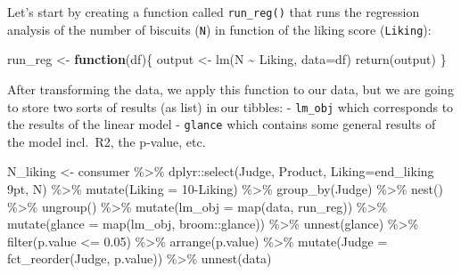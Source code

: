 \documentclass[
]{book}
\newenvironment{Shaded}{\begin{snugshade}}{\end{snugshade}}
\newcommand{\AttributeTok}[1]{\textcolor[rgb]{0.77,0.63,0.00}{#1}}
\newcommand{\ControlFlowTok}[1]{\textcolor[rgb]{0.13,0.29,0.53}{\textbf{#1}}}
\newcommand{\DecValTok}[1]{\textcolor[rgb]{0.00,0.00,0.81}{#1}}
\newcommand{\FloatTok}[1]{\textcolor[rgb]{0.00,0.00,0.81}{#1}}
\newcommand{\FunctionTok}[1]{\textcolor[rgb]{0.00,0.00,0.00}{#1}}
\newcommand{\NormalTok}[1]{#1}
\newcommand{\OtherTok}[1]{\textcolor[rgb]{0.56,0.35,0.01}{#1}}
\newcommand{\SpecialCharTok}[1]{\textcolor[rgb]{0.00,0.00,0.00}{#1}}
\newcommand{\StringTok}[1]{\textcolor[rgb]{0.31,0.60,0.02}{#1}}
\begin{document}
Let's start by creating a function called \texttt{run\_reg()} that runs the regression analysis of the number of biscuits (\texttt{N}) in function of the liking score (\texttt{Liking}):

\begin{Shaded}
\begin{Highlighting}[]
\NormalTok{run\_reg }\OtherTok{\textless{}{-}} \ControlFlowTok{function}\NormalTok{(df)\{}
\NormalTok{  output }\OtherTok{\textless{}{-}} \FunctionTok{lm}\NormalTok{(N }\SpecialCharTok{\textasciitilde{}}\NormalTok{ Liking, }\AttributeTok{data=}\NormalTok{df)}
  \FunctionTok{return}\NormalTok{(output)}
\NormalTok{\}}
\end{Highlighting}
\end{Shaded}

After transforming the data, we apply this function to our data, but we are going to store two sorts of results (as list) in our tibbles:
- \texttt{lm\_obj} which corresponds to the results of the linear model
- \texttt{glance} which contains some general results of the model incl.~R2, the p-value, etc.

\begin{Shaded}
\begin{Highlighting}[]
\NormalTok{N\_liking }\OtherTok{\textless{}{-}}\NormalTok{ consumer }\SpecialCharTok{\%\textgreater{}\%} 
\NormalTok{  dplyr}\SpecialCharTok{::}\FunctionTok{select}\NormalTok{(Judge, Product, }\AttributeTok{Liking=}\StringTok{\textasciigrave{}}\AttributeTok{end\_liking 9pt}\StringTok{\textasciigrave{}}\NormalTok{, N) }\SpecialCharTok{\%\textgreater{}\%} 
  \FunctionTok{mutate}\NormalTok{(}\AttributeTok{Liking =} \DecValTok{10}\SpecialCharTok{{-}}\NormalTok{Liking) }\SpecialCharTok{\%\textgreater{}\%} 
  \FunctionTok{group\_by}\NormalTok{(Judge) }\SpecialCharTok{\%\textgreater{}\%}
  \FunctionTok{nest}\NormalTok{() }\SpecialCharTok{\%\textgreater{}\%}
  \FunctionTok{ungroup}\NormalTok{() }\SpecialCharTok{\%\textgreater{}\%}
  \FunctionTok{mutate}\NormalTok{(}\AttributeTok{lm\_obj =} \FunctionTok{map}\NormalTok{(data, run\_reg)) }\SpecialCharTok{\%\textgreater{}\%} 
  \FunctionTok{mutate}\NormalTok{(}\AttributeTok{glance =} \FunctionTok{map}\NormalTok{(lm\_obj, broom}\SpecialCharTok{::}\NormalTok{glance)) }\SpecialCharTok{\%\textgreater{}\%} 
  \FunctionTok{unnest}\NormalTok{(glance) }\SpecialCharTok{\%\textgreater{}\%} 
  \FunctionTok{filter}\NormalTok{(p.value }\SpecialCharTok{\textless{}=} \FloatTok{0.05}\NormalTok{) }\SpecialCharTok{\%\textgreater{}\%} 
  \FunctionTok{arrange}\NormalTok{(p.value) }\SpecialCharTok{\%\textgreater{}\%} 
  \FunctionTok{mutate}\NormalTok{(}\AttributeTok{Judge =} \FunctionTok{fct\_reorder}\NormalTok{(Judge, p.value)) }\SpecialCharTok{\%\textgreater{}\%} 
  \FunctionTok{unnest}\NormalTok{(data)}
\end{Highlighting}
\end{Shaded}
\end{document}
